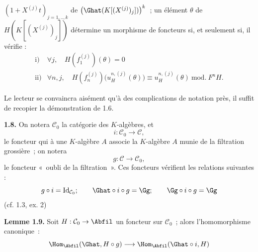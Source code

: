 \((1+X^{(j)}t)_{j=1,..,k}\) de \(\bigl(\Ghat(K[(X^{(j)})_j])\bigr)^k\)~; un
élément \(\theta\) de \(H(K[(X^{(j)})_j])\) détermine un morphisme de foncteurs si, et seulement si, il vérifie :
\[
\begin{array}{ll}
\text{i)}& \forall j,\quad H(f_1^{(j)})(\theta)=0\\[0.3em]
\text{ii)}& \forall n,j,\quad
H(f_n^{(j)})\bigl(u_H^{n,(j)}(\theta)\bigr)
\equiv u_H^{n,(j)}(\theta)\ \mathrm{mod.}\ F^nH.
\end{array}
\]

Le lecteur se convaincra aisément qu'à des complications de notation près, il suffit de recopier la démonstration de 1.6.

\textbf{1.8.} On notera \(\mathcal C_0\) la catégorie des \(K\)-algèbres, et
\[
  i:\mathcal C_0\longrightarrow \mathcal C,
\]
le foncteur qui à une \(K\)-algèbre \(A\) associe la \(K\)-algèbre \(A\) munie de la filtration grossière~; on notera
\[
  g:\mathcal C\longrightarrow\mathcal C_0,
\]
le foncteur «~oubli de la filtration~». Ces foncteurs vérifient les relations suivantes :
\[
  g\circ i=\operatorname{Id}_{\mathcal C_0};\qquad
  \Ghat\circ i\circ g=\Gg;\qquad
  \Gg\circ i\circ g=\Gg
\]
(cf. 1.3, ex. 2)

\textbf{Lemme 1.9.} Soit \(H:\mathcal C_0\to\Abfil\) un foncteur sur \(\mathcal C_0\)~; alors l'homomorphisme canonique~:
\[
  \Hom_{\Abfil}(\Ghat,H\circ g)
  \longrightarrow
  \Hom_{\Abfil}(\Ghat\circ i,H)
\]
